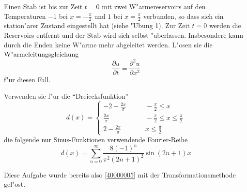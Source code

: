Einen Stab ist bis zur Zeit $t=0$ mit zwei
W"armereservoirs auf den Temperaturen $-1$ bei $x=-\frac{\pi}2$ und
$1$ bei $x=\frac{\pi}2$ verbunden,
so dass sich ein station"arer Zustand eingestellt hat (siehe
"Ubung 1). Zur Zeit $t=0$ werden die Reservoirs entfernt und der
Stab wird sich selbst "uberlassen. Insbesondere kann durch die
Enden keine W"arme mehr abgeleitet werden. L"osen sie die
W"armeleitungsgleichung
\[
\frac{\partial u}{\partial t}=\frac{\partial^2 u}{\partial x^2}
\]
f"ur diesen Fall.

\begin{hinweis}
Verwenden sie f"ur die
``Dreiecksfunktion''
\[
d(x)
=
\begin{cases}
\displaystyle-2-\frac{2x}{\pi}&\qquad \displaystyle-\frac{\pi}2\le x\\
\displaystyle\frac{2x}{\pi}&\qquad \displaystyle-\frac{\pi}2\le x\le \frac{\pi}2\\
\displaystyle2-\frac{2x}{\pi}&\qquad \displaystyle x\le\frac{\pi}2
\end{cases}
\]
die folgende nur Sinus-Funktionen
verwendende Fourier-Reihe
\[
d(x)=\sum_{n=0}^\infty \frac{8(-1)^n}{\pi^2(2n+1)^2}\sin (2n+1)x
\]
\end{hinweis}

\begin{hinweis}
Diese Aufgabe wurde bereits also \ref{40000005} mit der Transformationsmethode
gel"ost.
\end{hinweis}

